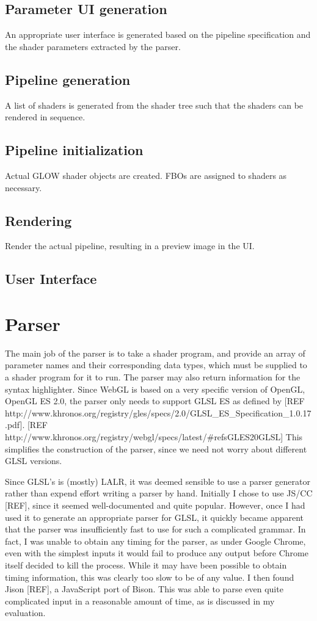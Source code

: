 \documentclass[12pt,twoside,notitlepage]{report}
\begin{document}
\subsection{Parameter UI generation}
An appropriate user interface is generated based on the pipeline specification and the shader parameters extracted by the parser.
\subsection{Pipeline generation}
A list of shaders is generated from the shader tree such that the shaders can be rendered in sequence.
\subsection{Pipeline initialization}
Actual GLOW shader objects are created. FBOs are assigned to shaders as necessary.
\subsection{Rendering}
Render the actual pipeline, resulting in a preview image in the UI.
\subsection{User Interface}

\section{Parser}
The main job of the parser is to take a shader program, and provide an array of parameter names and their corresponding data types, which must be supplied to a shader program for it to run. The parser may also return information for the syntax highlighter. Since WebGL is based on a very specific version of OpenGL, OpenGL ES 2.0, the parser only needs to support GLSL ES as defined by [REF http://www.khronos.org/registry/gles/specs/2.0/GLSL_ES_Specification_1.0.17.pdf]. [REF http://www.khronos.org/registry/webgl/specs/latest/#refsGLES20GLSL] This simplifies the construction of the parser, since we need not worry about different GLSL versions.

Since GLSL's is (mostly) LALR, it was deemed sensible to use a parser generator rather than expend  effort writing a parser by hand. Initially I chose to use JS/CC [REF], since it seemed well-documented and quite popular. However, once I had used it to generate an appropriate parser for GLSL, it quickly became apparent that the parser was insufficiently fast to use for such a complicated grammar. In fact, I was unable to obtain any timing for the parser, as under Google Chrome, even with the simplest inputs it would fail to produce any output before Chrome itself decided to kill the process. While it may have been possible to obtain timing information, this was clearly too slow to be of any value. I then found Jison [REF], a JavaScript port of Bison. This was able to parse even quite complicated input in a reasonable amount of time, as is discussed in my evaluation.
\end{document}
